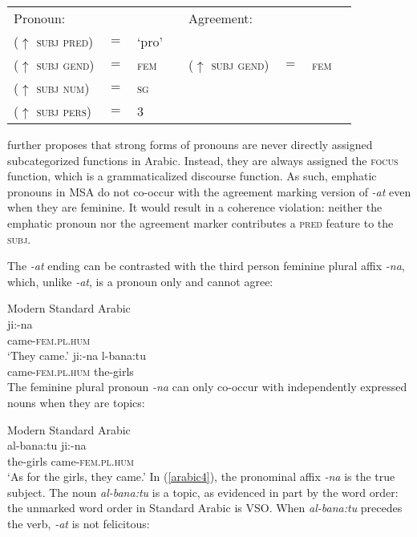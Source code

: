\documentclass[output=paper,hidelinks]{langscibook}
\begin{document}
 \ea  \label{aic6rab}\begin{tabular}[t]{llllllll }
{Pronoun:} &&&&{Agreement:} &&& \\
($\uparrow$ \textsc{subj pred}) & $=$ & `pro'  &\\
 ($\uparrow$ \textsc{subj  gend}) & $=$ &  \textsc{fem} & {\hspace{.2in} } &($\uparrow$ \textsc{subj gend}) & $=$ &  \textsc{fem}  \\
 ($\uparrow$ \textsc{subj  num}) & $=$ &  \textsc{sg}   &&   \\
($\uparrow$ \textsc{subj pers}) & $=$ &    3   &&   
 \end{tabular}
\z
 \citet{FF}  further proposes  that   strong forms of pronouns are never directly assigned subcategorized functions in Arabic.  Instead,  they are always assigned the \textsc{focus} function, which is a grammaticalized discourse function.  As such, emphatic pronouns in MSA  do not co-occur with the agreement marking version of  \textit{-at} even when they are feminine.  It would result in a coherence violation:  neither the emphatic pronoun nor the agreement marker contributes a \textsc{pred} feature to the \textsc{subj}.  
 
 The  \textit{-at}  ending  can be  contrasted with the third person feminine plural affix \textit{-na}, which, unlike \textit{-at}, is a pronoun only and cannot agree: 
 
    \ea \label{arabic3} Modern Standard Arabic\\
    \ea
    \gll   ji:{\textglotstop}-na  \\
      came-\textsc{fem.pl.hum}       \\
    \glt `They came.'
    \ex  \label{arabic2}
    \gll *ji:{\textglotstop}-na l-bana:tu \\
   came-\textsc{fem.pl.hum} the-girls \\
 \z\z
The feminine plural pronoun \textit{-na}  can  only  co-occur with independently expressed nouns when  they are topics: 
  
  
\ea \label{arabic4}  Modern Standard Arabic\\
\gll  al-bana:tu ji:{\textglotstop}-na  \\
 the-girls came-\textsc{fem.pl.hum}       \\
\glt `As for the girls, they came.'
     \z
  In (\ref{arabic4}), the pronominal affix \textit{-na} is the true subject. The noun \textit{al-bana:tu} is a topic, as evidenced in part by the word order: the unmarked word order in Standard Arabic is VSO.  When  \textit{al-bana:tu} precedes the verb,  \textit{-at} is not felicitous:
 
\end{document}
